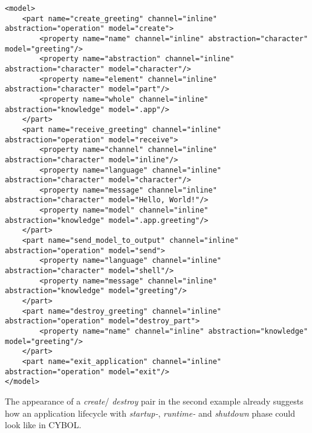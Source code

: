 \begin{scriptsize}
    \begin{verbatim}
<model>
    <part name="create_greeting" channel="inline" abstraction="operation" model="create">
        <property name="name" channel="inline" abstraction="character" model="greeting"/>
        <property name="abstraction" channel="inline" abstraction="character" model="character"/>
        <property name="element" channel="inline" abstraction="character" model="part"/>
        <property name="whole" channel="inline" abstraction="knowledge" model=".app"/>
    </part>
    <part name="receive_greeting" channel="inline" abstraction="operation" model="receive">
        <property name="channel" channel="inline" abstraction="character" model="inline"/>
        <property name="language" channel="inline" abstraction="character" model="character"/>
        <property name="message" channel="inline" abstraction="character" model="Hello, World!"/>
        <property name="model" channel="inline" abstraction="knowledge" model=".app.greeting"/>
    </part>
    <part name="send_model_to_output" channel="inline" abstraction="operation" model="send">
        <property name="language" channel="inline" abstraction="character" model="shell"/>
        <property name="message" channel="inline" abstraction="knowledge" model="greeting"/>
    </part>
    <part name="destroy_greeting" channel="inline" abstraction="operation" model="destroy_part">
        <property name="name" channel="inline" abstraction="knowledge" model="greeting"/>
    </part>
    <part name="exit_application" channel="inline" abstraction="operation" model="exit"/>
</model>
    \end{verbatim}
\end{scriptsize}

The appearance of a \emph{create}/ \emph{destroy} pair in the second example
already suggests how an application lifecycle with \emph{startup-},
\emph{runtime-} and \emph{shutdown} phase could look like in CYBOL.
